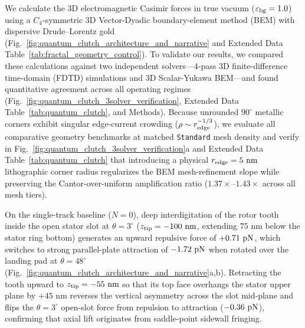 \documentclass[pdflatex,sn-nature]{sn-jnl}
\DeclareRobustCommand{\roundtwo}[1]{\fpeval{round(#1,2)}}
\begin{document}
We calculate the 3D electromagnetic Casimir forces in true vacuum ($\varepsilon_{\rm bg}=1.0$) using a $C_4$-symmetric 3D Vector-Dyadic boundary-element method (BEM) with dispersive Drude--Lorentz gold (Fig.~\ref{fig:quantum_clutch_architecture_and_narrative} and Extended Data Table~\ref{tab:fractal_geometry_control}). To validate our results, we compared these calculations against two independent solvers---4-pass 3D finite-difference time-domain (FDTD) simulations and 3D Scalar-Yukawa BEM\cite{oskooi2010,rodriguez2011}---and found quantitative agreement across all operating regimes (Fig.~\ref{fig:quantum_clutch_3solver_verification}, Extended Data Table~\ref{tab:quantum_clutch}, and Methods). Because unrounded $90^\circ$ metallic corners exhibit singular edge-current crowding ($\rho \sim r_{\rm edge}^{-1/3}$), we evaluate all comparative geometry benchmarks at matched \texttt{Standard} mesh density and verify in Fig.~\ref{fig:quantum_clutch_3solver_verification}a and Extended Data Table~\ref{tab:quantum_clutch} that introducing a physical $r_{\rm edge} = 5\text{ nm}$ lithographic corner radius regularizes the BEM mesh-refinement slope while preserving the Cantor-over-uniform amplification ratio ($1.37\times\text{--}1.43\times$ across all mesh tiers).

On the single-track baseline ($N=0$), deep interdigitation of the rotor tooth inside the open stator slot at $\theta=3^\circ$ ($z_{\rm tip} = -100\text{ nm}$, extending $75\text{ nm}$ below the stator ring bottom) generates an upward repulsive force of $+\roundtwo{\SingletoothTrackzeroBemThetathreeFZPn}\text{ pN}$, which switches to strong parallel-plate attraction of $\roundtwo{\SingletoothTrackzeroBemThetafoureightFZPn}\text{ pN}$ when rotated over the landing pad at $\theta=48^\circ$ (Fig.~\ref{fig:quantum_clutch_architecture_and_narrative}a,b). Retracting the tooth upward to $z_{\rm tip} = -55\text{ nm}$ so that its top face overhangs the stator upper plane by $+45\text{ nm}$ reverses the vertical asymmetry across the slot mid-plane and flips the $\theta=3^\circ$ open-slot force from repulsion to attraction ($\roundtwo{\SingletoothTrackzeroOverhangBemThetathreeFZPn}\text{ pN}$), confirming that axial lift originates from saddle-point sidewall fringing\cite{levin2010}.
\end{document}
